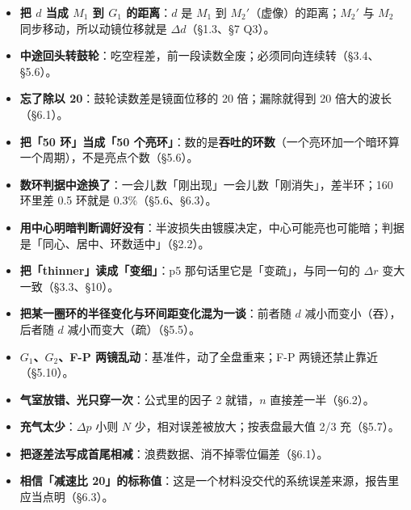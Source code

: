 \documentclass[11pt]{ctexart}
\begin{document}

\begin{itemize}
\item \textbf{把 \(d\) 当成 \(M_1\) 到 \(G_1\) 的距离}：\(d\) 是 \(M_1\) 到 \(M_2'\)（虚像）的距离；\(M_2'\) 与 \(M_2\) 同步移动，所以动镜位移就是 \(\Delta d\)（§1.3、§7 Q3）。
\item \textbf{中途回头转鼓轮}：吃空程差，前一段读数全废；必须同向连续转（§3.4、§5.6）。
\item \textbf{忘了除以 20}：鼓轮读数差是镜面位移的 20 倍；漏除就得到 20 倍大的波长（§6.1）。
\item \textbf{把「50 环」当成「50 个亮环」}：数的是\textbf{吞吐的环数}（一个亮环加一个暗环算一个周期），不是亮点个数（§5.6）。
\item \textbf{数环判据中途换了}：一会儿数「刚出现」一会儿数「刚消失」，差半环；160 环里差 0.5 环就是 0.3\%（§5.6、§6.3）。
\item \textbf{用中心明暗判断调好没有}：半波损失由镀膜决定，中心可能亮也可能暗；判据是「同心、居中、环数适中」（§2.2）。
\item \textbf{把「thinner」读成「变细」}：p5 那句话里它是「变疏」，与同一句的 \(\Delta r\) 变大一致（§3.3、§10）。
\item \textbf{把某一圈环的半径变化与环间距变化混为一谈}：前者随 \(d\) 减小而变小（吞），后者随 \(d\) 减小而变大（疏）（§5.5）。
\item \textbf{\(G_1\)、\(G_2\)、F-P 两镜乱动}：基准件，动了全盘重来；F-P 两镜还禁止靠近（§5.10）。
\item \textbf{气室放错、光只穿一次}：公式里的因子 2 就错，\(n\) 直接差一半（§6.2）。
\item \textbf{充气太少}：\(\Delta p\) 小则 \(N\) 少，相对误差被放大；按表盘最大值 2/3 充（§5.7）。
\item \textbf{把逐差法写成首尾相减}：浪费数据、消不掉零位偏差（§6.1）。
\item \textbf{相信「减速比 20」的标称值}：这是一个材料没交代的系统误差来源，报告里应当点明（§6.3）。
\end{itemize}

\end{document}
